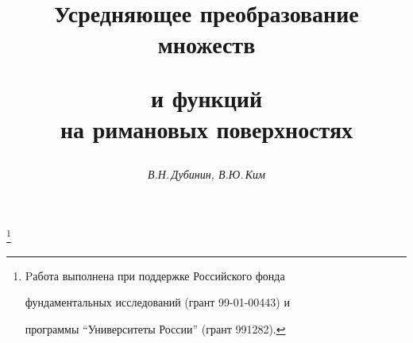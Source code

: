 




%


\newcommand{\re}{\operatorname{Re}}


\newcommand{\im}{\operatorname{Im}}


\newcommand{\pr}{\operatorname{pr}}


\newcommand{\tts}[1]{}







\setcounter{page}{21}















\author{\it В.Н.\,Дубинин, В.Ю.\,Ким }




\title{Усредняющее преобразование множеств


и функций\\ на римановых поверхностях}


\thanks{Pабота выполнена при поддержке Российского фонда


фундаментальных исследований (грант 99-01-00443) и


программы ``Университеты России'' (грант 991282).}





\date{}




\pagestyle{plain} %







